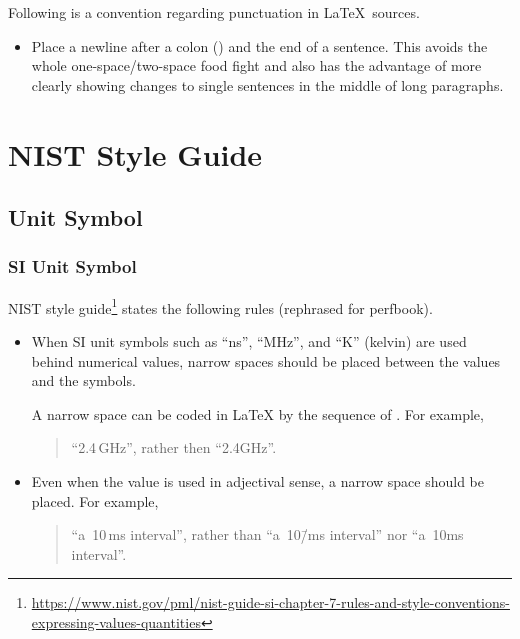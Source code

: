 Following is a convention regarding punctuation in \LaTeX\ sources.

\begin{itemize}
\item Place a newline after a colon (\co{:}) and the end of a sentence.
  This avoids the whole one-space/two-space food fight and also has
  the advantage of more clearly showing changes to single sentences
  in the middle of long paragraphs.
\end{itemize}

\section{NIST Style Guide}
\label{sec:app:styleguide:NIST Style Guide}

\subsection{Unit Symbol}
\label{sec:app:styleguide:Unit Symbol}

\subsubsection{SI Unit Symbol}
\label{sec:app:styleguide:SI Unit Symbol}

NIST style guide\footnote{
  \url{https://www.nist.gov/pml/nist-guide-si-chapter-7-rules-and-style-conventions-expressing-values-quantities}}
states the following rules (rephrased for perfbook).

\begin{itemize}
\item When SI unit symbols such as ``ns'', ``MHz'', and ``K'' (kelvin)
are used behind numerical values, narrow spaces should be placed between
the values and the symbols.

A narrow space can be coded in \LaTeX{} by the sequence of \qco{\\,}.
For example,
\begin{quote}
  ``2.4\,GHz'', rather then ``2.4GHz''.
\end{quote}

\item Even when the value is used in adjectival sense, a narrow space
  should be placed.
  For example,
\begin{quote}
  ``a~10\,ms interval'', rather than ``a~10\=/ms interval'' nor
  ``a~10ms interval''.
\end{quote}
\end{itemize}

